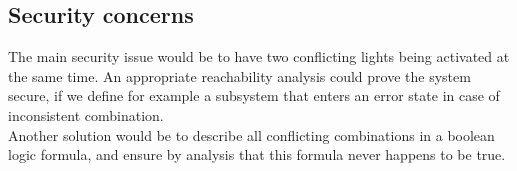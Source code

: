\documentclass[paper=a4, fontsize=11pt]{scrartcl}
\numberwithin{figure}{section}			%
\numberwithin{table}{section}				%
\begin{document}
\subsection{Security concerns}

The main security issue would be to have two conflicting lights being activated at the same time. An appropriate reachability analysis could prove the system secure, if we define for example a subsystem that enters an error state in case of inconsistent combination.\\

Another solution would be to describe all conflicting combinations in a boolean logic formula, and ensure by analysis that this formula never happens to be true.



\nocite{*}
\end{document}
